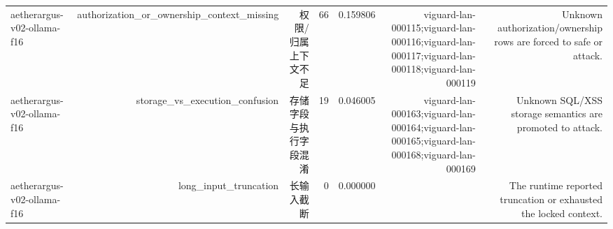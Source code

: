 \begin{table}[t]
\begin{tabular}{lrrrrrr}
aetherargus-v02-ollama-f16 & authorization\_or\_ownership\_context\_missing & 权限/归属上下文不足 & 66 & 0.159806 & viguard-lan-000115;viguard-lan-000116;viguard-lan-000117;viguard-lan-000118;viguard-lan-000119 & Unknown authorization/ownership rows are forced to safe or attack. \\
aetherargus-v02-ollama-f16 & storage\_vs\_execution\_confusion & 存储字段与执行字段混淆 & 19 & 0.046005 & viguard-lan-000163;viguard-lan-000164;viguard-lan-000165;viguard-lan-000168;viguard-lan-000169 & Unknown SQL/XSS storage semantics are promoted to attack. \\
aetherargus-v02-ollama-f16 & long\_input\_truncation & 长输入截断 & 0 & 0.000000 &  & The runtime reported truncation or exhausted the locked context. \\
\bottomrule
\end{tabular}
\end{table}
